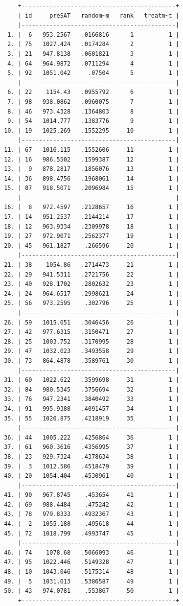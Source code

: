 \documentclass[
]{book}
\begin{document}
\begin{verbatim}
     +--------------------------------------------+
     | id     preSAT   random~m   rank   treatm~t |
     |--------------------------------------------|
  1. |  6   953.2567   .0166816      1          1 |
  2. | 75   1027.424   .0174284      2          1 |
  3. | 21   947.8138   .0601821      3          1 |
  4. | 64   964.9872   .0711294      4          1 |
  5. | 92   1051.042     .07504      5          1 |
     |--------------------------------------------|
  6. | 22    1154.43   .0955792      6          1 |
  7. | 98   938.0862   .0960075      7          1 |
  8. | 46   973.4328   .1364803      8          1 |
  9. | 54   1014.777   .1383776      9          1 |
 10. | 19   1025.269   .1552295     10          1 |
     |--------------------------------------------|
 11. | 67   1016.115   .1552606     11          1 |
 12. | 16   986.5502   .1599387     12          1 |
 13. |  9   878.2817   .1856076     13          1 |
 14. | 36   898.4756   .1968061     14          1 |
 15. | 87   918.5071   .2096984     15          1 |
     |--------------------------------------------|
 16. |  8   972.4597   .2128657     16          1 |
 17. | 14   951.2537   .2144214     17          1 |
 18. | 12   963.9334   .2309978     18          1 |
 19. | 27   972.9071   .2562377     19          1 |
 20. | 45   961.1827    .266596     20          1 |
     |--------------------------------------------|
 21. | 38    1054.86   .2714473     21          1 |
 22. | 29   941.5311   .2721756     22          1 |
 23. | 40   928.1702   .2802632     23          1 |
 24. | 24   964.6517   .2998621     24          1 |
 25. | 56   973.2595    .302796     25          1 |
     |--------------------------------------------|
 26. | 59   1015.051   .3046456     26          1 |
 27. | 42   977.6315   .3150471     27          1 |
 28. | 25   1003.752   .3170995     28          1 |
 29. | 47   1032.023   .3493558     29          1 |
 30. | 73   864.4878   .3589761     30          1 |
     |--------------------------------------------|
 31. | 60   1022.622   .3599698     31          1 |
 32. | 84   980.5345   .3756694     32          1 |
 33. | 76   947.2341   .3840492     33          1 |
 34. | 91   995.9388   .4091457     34          1 |
 35. | 55   1020.875   .4218919     35          1 |
     |--------------------------------------------|
 36. | 44   1005.222   .4256864     36          1 |
 37. | 61   960.3616   .4356995     37          1 |
 38. | 23   929.7324   .4378634     38          1 |
 39. |  3   1012.586   .4518479     39          1 |
 40. | 20   1054.404   .4530961     40          1 |
     |--------------------------------------------|
 41. | 90   967.8745    .453654     41          1 |
 42. | 69   988.4484    .475242     42          1 |
 43. | 78   979.8333   .4932367     43          1 |
 44. |  2   1055.188    .495618     44          1 |
 45. | 72   1018.799   .4993747     45          1 |
     |--------------------------------------------|
 46. | 74    1078.68   .5066093     46          1 |
 47. | 95   1022.446   .5149328     47          1 |
 48. | 10   1043.046   .5175314     48          1 |
 49. |  5   1031.013   .5386587     49          1 |
 50. | 43   974.0781    .553867     50          1 |
     +--------------------------------------------+
\end{verbatim}
\end{document}

